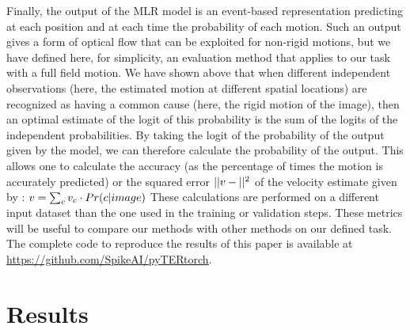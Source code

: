 \documentclass[default]{sn-jnl}%
\theoremstyle{thmstyleone}%
\theoremstyle{thmstyletwo}%
\theoremstyle{thmstylethree}%
\begin{document}
%
Finally, the output of the MLR model is an event-based representation predicting at each position and at each time the probability of each motion. Such an output gives a form of optical flow that can be exploited for non-rigid motions, but we have defined here, for simplicity, an evaluation method that applies to our task with a full field motion. We have shown above that when different independent observations (here, the estimated motion at different spatial locations) are recognized as having a common cause (here, the rigid motion of the image), then an optimal estimate of the logit of this probability is the sum of the logits of the independent probabilities. By taking the logit of the probability of the output given by the model, we can therefore calculate the probability of the output. This allows one to calculate the accuracy (as the percentage of times the motion is accurately predicted) or the squared error $|| v - ||^2$ of the velocity estimate given by :
$
v = \sum_{c} v_c \cdot Pr(c \vert image)
$ 
These calculations are performed on a different input dataset than the one used in the training or validation steps. These metrics will be useful to compare our methods with other methods on our defined task.  The complete code to reproduce the results of this paper is available at \url{https://github.com/SpikeAI/pyTERtorch}.  
%
\section{Results}
\label{sec:results}
\end{document}
